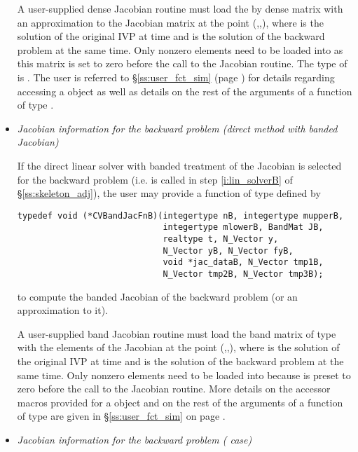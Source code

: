 \begin{itemize}
  A user-supplied dense Jacobian routine must load the  by 
  dense matrix  with an approximation to the Jacobian matrix
  at the point (,,), where  is the solution
  of the original IVP at time  and  is the solution of the
  backward problem at the same time.
  Only nonzero elements need to be loaded into  as this matrix 
  is set to zero before the call to the Jacobian routine. 
  The type of  is . The user is referred to 
  \S\ref{ss:user_fct_sim} (page \pageref{p:djac}) for details regarding 
  accessing a  object as well as details on the rest of the 
  arguments of a function of type .

\item {\em Jacobian information for the backward problem
    (direct method with banded Jacobian)}

  If the direct linear solver with banded treatment of the Jacobian is selected
  for the backward problem (i.e.  is called in step \ref{i:lin_solverB} 
  of \S\ref{ss:skeleton_adj}), the user may provide a function of type  
  defined by
\begin{verbatim}
typedef void (*CVBandJacFnB)(integertype nB, integertype mupperB, 
                             integertype mlowerB, BandMat JB,
                             realtype t, N_Vector y, 
                             N_Vector yB, N_Vector fyB,
                             void *jac_dataB, N_Vector tmp1B, 
                             N_Vector tmp2B, N_Vector tmp3B);
\end{verbatim}
  to compute the banded Jacobian of the backward problem (or an approximation
  to it).

  A user-supplied band Jacobian routine must load the band matrix 
  of type  with the elements of the Jacobian at the
  point (,,), where  is the solution
  of the original IVP at time  and  is the solution of the
  backward problem at the same time.  
  Only nonzero elements need to be loaded into
   because  is preset to zero before the call to the
  Jacobian routine. More details on the accessor macros provided for
  a  object and on the rest of the arguments of a function
  of type  are given in \S\ref{ss:user_fct_sim} on page
  \pageref{p:bjac}.

\item {\em Jacobian information for the backward problem
    ({\spgmr} case)}


\end{itemize}
